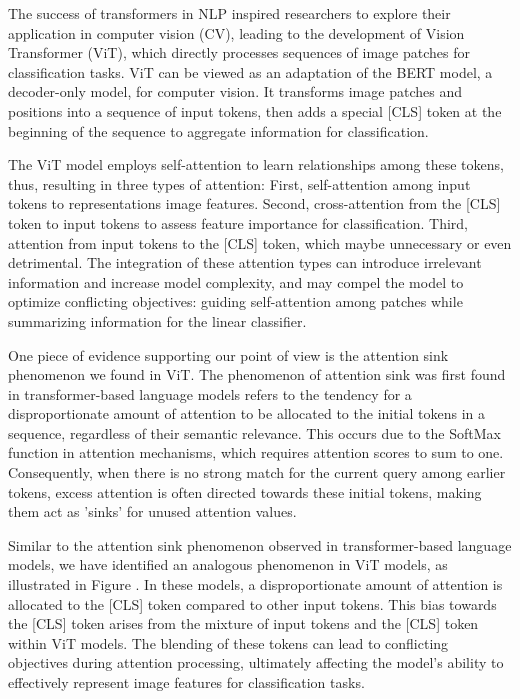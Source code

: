 \documentclass[anon,12pt]{colt2024} %
\begin{document}
The success of transformers in NLP inspired researchers to explore their application in computer vision (CV), leading to the development of Vision Transformer (ViT), which directly processes sequences of image patches for classification tasks.
ViT can be viewed as an adaptation of the BERT model, a decoder-only model, for computer vision.
It transforms image patches and positions into a sequence of input tokens, then adds a special [CLS] token at the beginning of the sequence to aggregate information for classification.

The ViT model employs self-attention to learn relationships among these tokens, thus, resulting in three types of attention:
First, self-attention among input tokens to representations image features. Second, cross-attention from the [CLS] token to input tokens to assess feature importance for classification. Third, attention from input tokens to the [CLS] token, which maybe unnecessary or even detrimental.
The integration of these attention types can introduce irrelevant information and increase model complexity, and may compel the model to optimize conflicting objectives: guiding self-attention among patches while summarizing information for the linear classifier.

One piece of evidence supporting our point of view is the attention sink phenomenon we found in ViT.
The phenomenon of attention sink was first found in transformer-based language models \cite{xiaoefficient} refers to the tendency for a disproportionate amount of attention to be allocated to the initial tokens in a sequence, regardless of their semantic relevance.
This occurs due to the SoftMax function in attention mechanisms, which requires attention scores to sum to one.
Consequently, when there is no strong match for the current query among earlier tokens, excess attention is often directed towards these initial tokens, making them act as 'sinks' for unused attention values.

Similar to the attention sink phenomenon observed in transformer-based language models, we have identified an analogous phenomenon in ViT models, as illustrated in Figure . In these models, a disproportionate amount of attention is allocated to the [CLS] token compared to other input tokens.
This bias towards the [CLS] token arises from the mixture of input tokens and the [CLS] token within ViT models.
The blending of these tokens can lead to conflicting objectives during attention processing, ultimately affecting the model's ability to effectively represent image features for classification tasks. 
\end{document}

